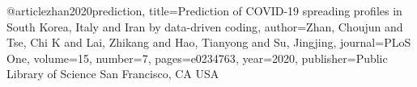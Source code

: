 @article{zhan2020prediction,
  title={Prediction of COVID-19 spreading profiles in South Korea, Italy and Iran by data-driven coding},
  author={Zhan, Choujun and Tse, Chi K and Lai, Zhikang and Hao, Tianyong and Su, Jingjing},
  journal={PLoS One},
  volume={15},
  number={7},
  pages={e0234763},
  year={2020},
  publisher={Public Library of Science San Francisco, CA USA}
}